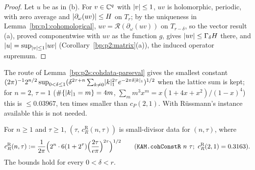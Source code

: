 \begin{proof}
\label{step:p2s:cp-apriori}
Let $u$ be as in (b). For $v\in\mathbb{C}^q$ with $\lvert v\rvert\le1$, $uv$ is holomorphic, periodic, with zero average and
$\lvert \partial_\omega(uv)\rvert\le H$ on $T_r$; by the uniqueness in Lemma~\ref{bp:p1:cohomological},
$uv=\mathcal R(\partial_\omega(uv))$ on $T_{r-\delta}$, so the vector result (a), proved componentwise with $uv$ as the function $g$, gives $\lvert uv\rvert\le\Gamma_\delta H$ there, and
$\lvert u\rvert=\sup_{\lvert v\rvert\le1}\lvert uv\rvert$ (Corollary~\ref{bp:p2:matrix}(a)), the induced operator supremum.
\end{proof}

\begin{remark}\label{bp:p2s:parseval-optimal}
The route of Lemma~\ref{bp:p2s:cohdata-parseval} gives the smallest constant
$(2\pi)^{-1}2^{n/2}\sup_{0<\delta\le1}(\delta^{2\tau+n}\sum_{k\ne0}\lvert k\rvert_1^{2\tau}e^{-2\pi\delta\lvert k\rvert_1})^{1/2}$ when the lattice sum is kept; for
$n=2$, $\tau=1$ ($\#\{\lvert k\rvert_1=m\}=4m$, $\sum_mm^3x^m=x(1+4x+x^2)/(1-x)^4$) this is $\le0.03967$, ten times smaller than
$c_P(2,1)$. With R\"ussmann's instance available this is not needed.
\end{remark}

\begin{lemma}\label{bp:p2s:cohdata-russmann}
For $n\ge1$ and $\tau\ge1$, $(\tau,\,c_R^{\mathrm{R}}(n,\tau))$ is small-divisor data for $(n,\tau)$, where
\[
c_R^{\mathrm R}(n,\tau):=\frac1{2\pi}\Bigl(2^n\cdot6(1+2^\tau)\Bigl(\frac{2\tau}{e\pi}\Bigr)^{2\tau}\Bigr)^{1/2}
\qquad(\texttt{KAM.cohConstR}\ n\ \tau;\ c_R^{\mathrm R}(2,1)=0.3163).
\]
The bounds hold for every $0<\delta<r$.
\par{}\par
{}
\end{lemma}

